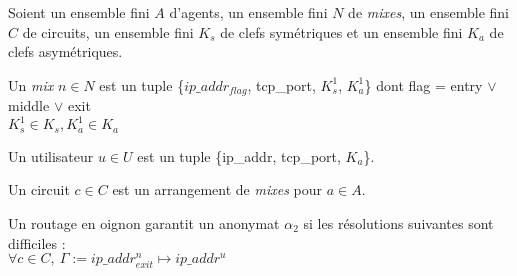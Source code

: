 \begin{definition}[Circuit]
    Soient un ensemble fini $A$ d'agents, un ensemble fini $N$ de \textit{mixes}, 
    un ensemble fini $C$ de circuits, un ensemble fini $K_s$ de clefs symétriques et un 
    ensemble fini $K_a$ de clefs asymétriques.

    \medskip
    \noindent
    Un \textit{mix} $n \in N$ est un tuple \{$ip\_addr_{flag}$, tcp\_port, $K_s^1$,
    $K_a^1$\} dont flag = entry $\vee$ middle $\vee$ exit\\
    $K_s^1 \in K_s, K_a^1 \in K_a$

    \medskip 
    \noindent
    Un utilisateur $u \in U$ est un tuple \{ip\_addr, tcp\_port, $K_a$\}.

    \medskip 
    \noindent
    Un circuit $c \in C$ est un arrangement de \textit{mixes} pour $a \in A$.
\end{definition}

\begin{proposition}
    Un routage en oignon garantit un anonymat $\alpha_2$ si les résolutions suivantes 
    sont difficiles :\\ 
    $\forall c \in C, \: \Gamma := ip\_addr_{exit}^n \mapsto ip\_addr^u$
\end{proposition}